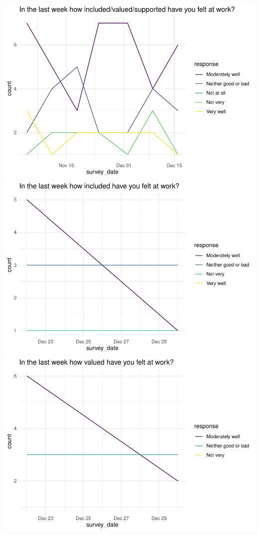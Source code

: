 \documentclass[
  10pt,
]{article}
\begin{document}
\includegraphics{../pdf/Report_files/figure-latex/plot_functions-4.pdf}
\includegraphics{../pdf/Report_files/figure-latex/plot_functions-5.pdf}
\includegraphics{../pdf/Report_files/figure-latex/plot_functions-6.pdf}
\end{document}
